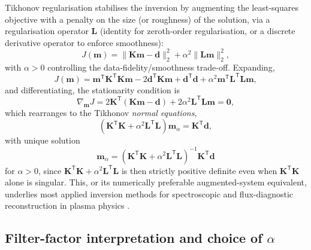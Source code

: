 Tikhonov regularisation stabilises the inversion by augmenting the least-squares objective with a penalty on the size (or roughness) of the solution, via a regularisation operator $\mathbf{L}$ (identity for zeroth-order regularisation, or a discrete derivative operator to enforce smoothness):
\begin{equation}
J(\mathbf{m}) = \|\mathbf{K}\mathbf{m} - \mathbf{d}\|_{2}^{2} + \alpha^{2}\|\mathbf{L}\mathbf{m}\|_{2}^{2},
\label{eq:tikhonov_functional}
\end{equation}
with $\alpha > 0$ controlling the data-fidelity/smoothness trade-off. Expanding,
\begin{equation}
J(\mathbf{m}) = \mathbf{m}^{\mathsf{T}}\mathbf{K}^{\mathsf{T}}\mathbf{K}\mathbf{m} - 2\mathbf{d}^{\mathsf{T}}\mathbf{K}\mathbf{m} + \mathbf{d}^{\mathsf{T}}\mathbf{d} + \alpha^{2}\mathbf{m}^{\mathsf{T}}\mathbf{L}^{\mathsf{T}}\mathbf{L}\mathbf{m},
\end{equation}
and differentiating, the stationarity condition is
\begin{equation}
\nabla_{\mathbf{m}} J = 2\mathbf{K}^{\mathsf{T}}(\mathbf{K}\mathbf{m} - \mathbf{d}) + 2\alpha^{2}\mathbf{L}^{\mathsf{T}}\mathbf{L}\mathbf{m} = \mathbf{0},
\end{equation}
which rearranges to the Tikhonov \emph{normal equations},
\begin{equation}
\boxed{\left(\mathbf{K}^{\mathsf{T}}\mathbf{K} + \alpha^{2}\mathbf{L}^{\mathsf{T}}\mathbf{L}\right)\mathbf{m}_{\alpha} = \mathbf{K}^{\mathsf{T}}\mathbf{d}},
\label{eq:normal_equations}
\end{equation}
with unique solution
\begin{equation}
\mathbf{m}_{\alpha} = \left(\mathbf{K}^{\mathsf{T}}\mathbf{K} + \alpha^{2}\mathbf{L}^{\mathsf{T}}\mathbf{L}\right)^{-1}\mathbf{K}^{\mathsf{T}}\mathbf{d}
\label{eq:tikhonov_solution}
\end{equation}
for $\alpha>0$, since $\mathbf{K}^{\mathsf{T}}\mathbf{K} + \alpha^{2}\mathbf{L}^{\mathsf{T}}\mathbf{L}$ is then strictly positive definite even when $\mathbf{K}^{\mathsf{T}}\mathbf{K}$ alone is singular. This, or its numerically preferable augmented-system equivalent, underlies most applied inversion methods for spectroscopic and flux-diagnostic reconstruction in plasma physics \cite{ref0677}.

\subsection{Filter-factor interpretation and choice of $\alpha$}

